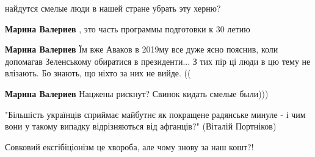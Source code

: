 \begin{itemize}
найдутся смелые люди в нашей стране убрать эту херню?

\begin{itemize}
 
\textbf{Марина Валериев} , это часть программы подготовки к 30 летию

 
\textbf{Марина Валериев} Їм вже Аваков в 2019му все дуже ясно пояснив, коли допомагав Зеленському обиратися в президенти...
З тих пір ці люди в цю тему не влізають. Бо знають, що ніхто за них не вийде. ((

 
\textbf{Марина Валериев} Нацжены рискнут? Свинок кидать смелые были)))
\end{itemize}

 

"Більшість українців сприймає майбутнє як покращене радянське минуле - і чим
вони у такому випадку відрізняються від афганців?" (Віталій Портніков)


 
Совковий ексгібіціонізм це хвороба, але чому знову за наш кошт?!

 

\end{itemize}
